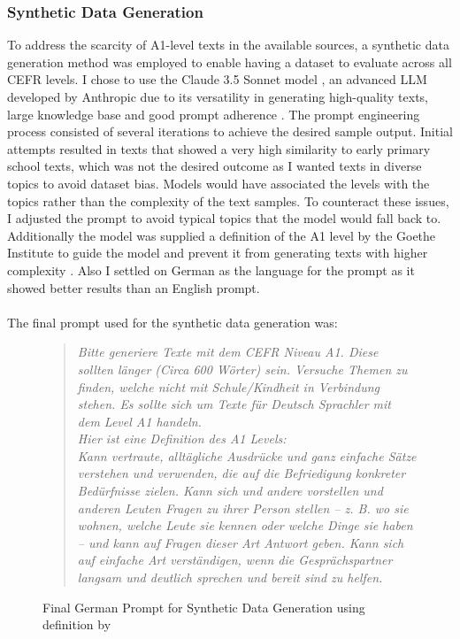 \subsubsection*{Synthetic Data Generation}
\label{sss:synthetic_data_generation}
To address the scarcity of A1-level texts in the available sources, a synthetic data generation method was employed to enable having a dataset to evaluate across all CEFR levels.
I chose to use the Claude 3.5 Sonnet model \citep{claude3.5sonnet}, an advanced LLM developed by Anthropic due to its versatility in generating high-quality texts, large knowledge base and good prompt adherence \citep{Huang2024}.
The prompt engineering process consisted of several iterations to achieve the desired sample output. Initial attempts resulted in texts that showed a very high similarity to early primary school texts, which was not the desired outcome as I wanted texts in diverse topics to avoid dataset bias. Models would have associated the levels with the topics rather than the complexity of the text samples. To counteract these issues, I adjusted the prompt to avoid typical topics that the model would fall back to. Additionally the model was supplied a definition of the A1 level by the Goethe Institute to guide the model and prevent it from generating texts with higher complexity \citep{goetheCefr}. Also I settled on German as the language for the prompt as it showed better results than an English prompt. \\ \\
The final prompt used for the synthetic data generation was:
\captionsetup{labelformat=prompt}
\begin{figure}[h]
    \begin{quotation}
        \textit{Bitte generiere Texte mit dem CEFR Niveau A1. Diese sollten länger (Circa 600 Wörter) sein. Versuche Themen zu finden, welche nicht mit Schule/Kindheit in Verbindung stehen. Es sollte sich um Texte für Deutsch Sprachler mit dem Level A1 handeln. \\
        Hier ist eine Definition des A1 Levels: \\
        Kann vertraute, alltägliche Ausdrücke und ganz einfache Sätze verstehen und verwenden, die auf die Befriedigung konkreter Bedürfnisse zielen.
        Kann sich und andere vorstellen und anderen Leuten Fragen zu ihrer Person stellen – z. B. wo sie wohnen, welche Leute sie kennen oder welche Dinge sie haben – und kann auf Fragen dieser Art Antwort geben.
        Kann sich auf einfache Art verständigen, wenn die Gesprächspartner langsam und deutlich sprechen und bereit sind zu helfen.}
    \end{quotation}
    \caption{Final German Prompt for Synthetic Data Generation using definition by \cite{goetheCefr}}
    \label{qu:synthetic_prompt}
\end{figure}
\captionsetup{labelformat=default}

